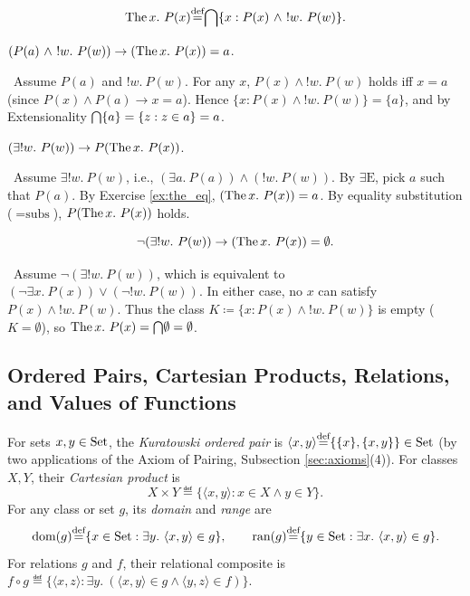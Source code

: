 \documentclass[10pt,a4paper]{article}
\begin{document}
\begin{definition}
$$\The x.\ P(x) \eqdef \inter \{x : P(x)\ \land\ !w.\ P(w)\}.$$
\end{definition}

\begin{exercise}\label{ex:the_eq}
$(P(a)\ \land\ !w.\ P(w)) \to (\The x.\ P(x))=a$.
\end{exercise}
\myprf\ Assume $P(a)$ and $!w.\ P(w)$. For any $x$, $P(x) \land !w.\ P(w)$ holds iff $x = a$ (since $P(x) \land P(a) \to x=a$). Hence $\{x : P(x) \land !w.\ P(w)\} = \{a\}$, and by Extensionality ${\bigcap} \{a\} = \{z : z \in a\} = a$. \myqed

\begin{exercise}\label{ex:the_prop}
$(\exists !w.\ P(w)) \to P(\The x.\ P(x))$.
\end{exercise}
\myprf\ Assume $\exists !w.\ P(w)$, i.e., $(\exists a.\ P(a)) \land (!w.\ P(w))$. By $\exists\textrm{E}$, pick $a$ such that $P(a)$. By Exercise \ref{ex:the_eq}, $({\textrm{The\,}} x.\ P(x)) = a$. By equality substitution ($=\textrm{subs}$), $P({\textrm{The\,}} x.\ P(x))$ holds. \myqed

\begin{lemma}\label{lem:the_default}
$$\neg (\exists !w.\ P(w)) \to ({\textrm{The\,}} x.\ P(x)) = \emptyset.$$
\end{lemma}
\myprf\ Assume $\neg (\exists !w.\ P(w))$, which is equivalent to $(\neg \exists x.\ P(x)) \lor (\neg !w.\ P(w))$. In either case, no $x$ can satisfy $P(x) \land !w.\ P(w)$. Thus the class $K \coloneqq \{x : P(x) \land !w.\ P(w)\}$ is empty ($K = \emptyset$), so ${\textrm{The\,}} x.\ P(x) = {\bigcap} \emptyset = \emptyset$. \myqed

\subsection{Ordered Pairs, Cartesian Products, Relations, and Values of Functions}\label{sec:pairs_rels}
\begin{definition}\label{def:pair_rel}
For sets $x, y \in {\textrm{Set}}$, the \emph{Kuratowski ordered pair} is $\langle x, y \rangle {\stackrel{{\textrm{def}}}{=}} \{\{x\}, \{x, y\}\} \in {\textrm{Set}}$ (by two applications of the Axiom of Pairing, Subsection \ref{sec:axioms}(4)). For classes $X, Y$, their \emph{Cartesian product} is
$$X \times Y \eqdef \{\langle x, y \rangle : x \in X \land y \in Y\}.$$
For any class or set $g$, its \emph{domain} and \emph{range} are
$$\dom(g) \eqdef \{x \in \Set : \exists y.\ \langle x, y \rangle \in g\}, \qquad \ran(g) \eqdef \{y \in \Set : \exists x.\ \langle x, y \rangle \in g\}.$$
For relations $g$ and $f$, their relational composite is $f \circ g \eqdef \{\langle x, z \rangle : \exists y.\ (\langle x, y \rangle \in g \land \langle y, z \rangle \in f)\}$.
\end{definition}
\end{document}
